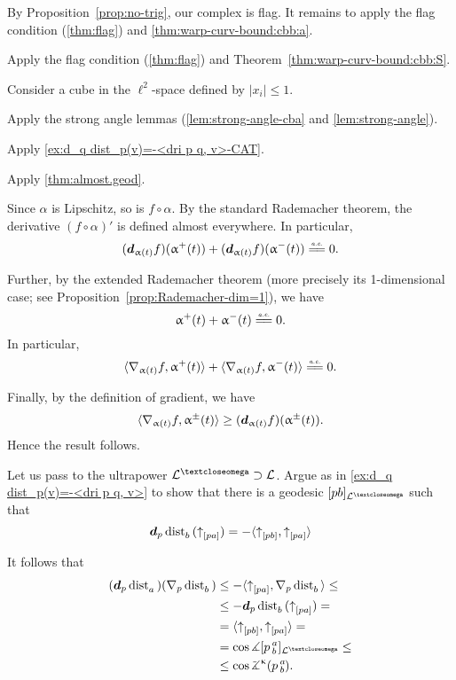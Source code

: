 By Proposition~\ref{prop:no-trig}, our complex is flag.
It remains to apply the flag condition (\ref{thm:flag}) and \ref{thm:warp-curv-bound:cbb:a}.

Apply the flag condition (\ref{thm:flag}) and Theorem~\ref{thm:warp-curv-bound:cbb:S}.

Consider a cube in the $\ell^2$-space defined by $|x_i|\le 1$.

Apply the strong angle lemmas
(\ref{lem:strong-angle-cba}
and \ref{lem:strong-angle}).

 Apply \ref{ex:d_q dist_p(v)=-<dri p q, v>-CAT}.

 Apply \ref{thm:almost.geod}.

Since $\alpha$ is Lipschitz, so is $f\circ\alpha$.
By the standard Rademacher theorem, the derivative $(f\circ\alpha)'$ is defined almost everywhere.
In particular, 
\[(\dd_{\alpha(t)}f)(\alpha^+(t))+(\dd_{\alpha(t)}f)(\alpha^-(t))\ae0.\]

Further, by the extended Rademacher theorem (more precisely its 1-dimensional case; see Proposition~\ref{prop:Rademacher-dim=1}),
we have 
\[\alpha^+(t)+\alpha^-(t)\ae0.\]
In particular,
\[\<\nabla_{\alpha(t)}f,\alpha^+(t)\>+\<\nabla_{\alpha(t)}f,\alpha^-(t)\>
\ae0.\]

Finally, by the definition of gradient, we have 
\[\<\nabla_{\alpha(t)}f,\alpha^\pm(t)\>\ge (\dd_{\alpha(t)}f)(\alpha^\pm(t)).\]
Hence the result follows.

Let us pass to the ultrapower $\spc{L}^\o\supset\spc{L}$.
Argue as in \ref{ex:d_q dist_p(v)=-<dri p q, v>} to show that there is a geodesic $[pb]_{\spc{L}^\o}$ such that 
\[\bm{d}_p\mathop{\rm dist}\nolimits_{b}^{{}}{}({\uparrow}_{[{p}{a}]})=-\langle{\uparrow}_{[{p}{b}]},{\uparrow}_{[{p}{a}]}\rangle\]

It follows that
\begin{align*}(\dd_p\distfun{a}{}{})(\nabla_p\distfun{b}{}{})&\le-\langle\dir pa,\nabla_p\distfun{b}{}{} \rangle\le
\\
&\le -\dd_p\distfun{b}{}{}(\dir pa)=
\\
&=\langle\dir pb, \dir pa\rangle=
\\
&= \cos\mangle\hinge p a b _{\spc{L}^\o}\le 
\\
&\le \cos\angk\kappa p a b.
\end{align*}


